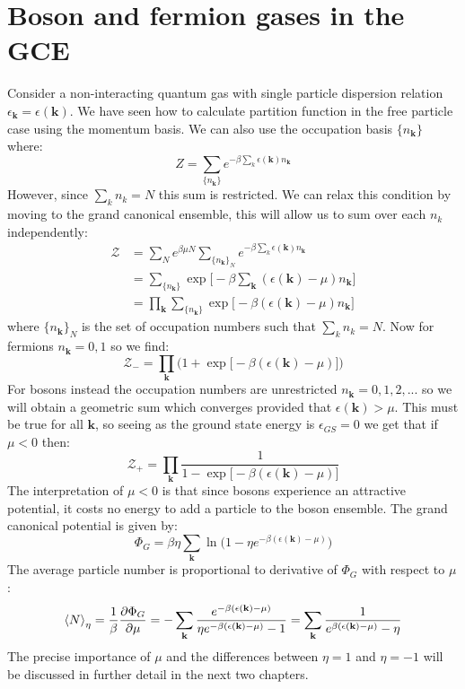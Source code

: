 \documentclass[a4paper,11pt,oneside]{book}
\begin{document}
\section{Boson and fermion gases in the GCE}
Consider a non-interacting quantum gas with single particle dispersion relation $\epsilon_\textbf{k}=\epsilon(\textbf{k})$. We have seen how to calculate partition function in the free particle case using the momentum basis. We can also use the occupation basis $\{n_\textbf{k}\}$ where:
\begin{equation}
    Z=\sum_{\{n_\textbf{k}\}} e^{-\beta \sum_k \epsilon(\textbf{k}) n_\textbf{k}}
\end{equation}
However, since $\sum_k n_k = N$ this sum is restricted. We can relax this condition by moving to the grand canonical ensemble, this will allow us to sum over each $n_k$ independently:
\begin{align}
    \mathcal{Z} &= \sum_N e^{\beta \mu N} \sum_{\{n_\textbf{k}\}_N} e^{-\beta \sum_k \epsilon(\textbf{k}) n_\textbf{k}}\\
    &=\sum_{\{n_\textbf{k}\}} \exp\bigg[-\beta \sum_\textbf{k}(\epsilon(\textbf{k})-\mu)n_\textbf{k}\bigg]\\
    &=\prod_\textbf{k}\sum_{\{n_\textbf{k}\}} \exp\big[-\beta(\epsilon(\textbf{k})-\mu)n_\textbf{k}\big]
\end{align}
where $\{n_\textbf{k}\}_N$ is the set of occupation numbers such that $\sum_k n_k = N$. Now for fermions $n_\textbf{k}=0,1$ so we find:
\begin{equation}
    \mathcal{Z}_- = \prod_\textbf{k} \big(1+\exp\big[-\beta(\epsilon(\textbf{k})-\mu)\big]\big)
\end{equation}
For bosons instead the occupation numbers are unrestricted $n_\textbf{k}=0,1,2,...$ so we will obtain a geometric sum which converges provided that $\epsilon(\textbf{k})>\mu$. This must be true for all $\textbf{k}$, so seeing as the ground state energy is $\epsilon_{GS}=0$ we get that if $\boxed{\mu<0}$ then:
\begin{equation}
    \mathcal{Z}_+ = \prod_\textbf{k} \frac{1}{1-\exp\big[-\beta(\epsilon(\textbf{k})-\mu)\big]}
\end{equation}
The interpretation of $\mu<0$ is that since bosons experience an attractive potential, it costs no energy to add a particle to the boson ensemble. The grand canonical potential is given by:
\begin{equation}
    \boxed{\Phi_G = \beta \eta \sum_\textbf{k} \ln\Big(1-\eta e^{-\beta(\epsilon(\textbf{k})-\mu)}\Big)}
\end{equation}
The average particle number is proportional to derivative of $\Phi_G$ with respect to $\mu$:
\begin{equation}
    \braket{N}_\eta = \frac{1}{\beta} \frac{\partial \Phi_G}{\partial \mu} =-\sum_{\textbf{k}}\frac{ e^{-\beta(\epsilon(\textbf{k})-\mu)}}{\eta e^{-\beta(\epsilon(\textbf{k})-\mu)}-1} = \sum_{\textbf{k}}\frac{1}{e^{\beta(\epsilon(\textbf{k})-\mu)}-\eta}
\end{equation}
The precise importance of $\mu$ and the differences between $\eta=1$ and $\eta=-1$ will be discussed in further detail in the next two chapters. 
\end{document}
